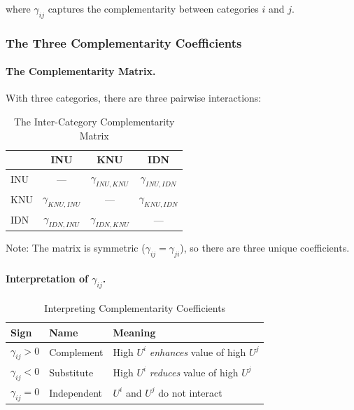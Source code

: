 where $\gamma_{ij}$ captures the complementarity between categories $i$ and $j$.

\subsubsection{The Three Complementarity Coefficients}

\paragraph{The Complementarity Matrix.}
With three categories, there are three pairwise interactions:

\begin{table}[htbp]
\centering
\caption{The Inter-Category Complementarity Matrix}
\label{tab:complementarity-matrix}
\renewcommand{\arraystretch}{1.4}
\begin{tabular}{@{}l|ccc@{}}
\toprule
& INU & KNU & IDN \\
\midrule
INU & --- & $\gamma_{INU,KNU}$ & $\gamma_{INU,IDN}$ \\
KNU & $\gamma_{KNU,INU}$ & --- & $\gamma_{KNU,IDN}$ \\
IDN & $\gamma_{IDN,INU}$ & $\gamma_{IDN,KNU}$ & --- \\
\bottomrule
\end{tabular}
\end{table}

Note: The matrix is symmetric ($\gamma_{ij} = \gamma_{ji}$), so there are 
three unique coefficients.

\paragraph{Interpretation of $\gamma_{ij}$.}

\begin{table}[htbp]
\centering
\caption{Interpreting Complementarity Coefficients}
\label{tab:gamma-interpretation}
\renewcommand{\arraystretch}{1.3}
\begin{tabular}{@{}lll@{}}
\toprule
\textbf{Sign} & \textbf{Name} & \textbf{Meaning} \\
\midrule
$\gamma_{ij} > 0$ & Complement & High $U^i$ \emph{enhances} value of high $U^j$ \\
$\gamma_{ij} < 0$ & Substitute & High $U^i$ \emph{reduces} value of high $U^j$ \\
$\gamma_{ij} = 0$ & Independent & $U^i$ and $U^j$ do not interact \\
\bottomrule
\end{tabular}
\end{table}

